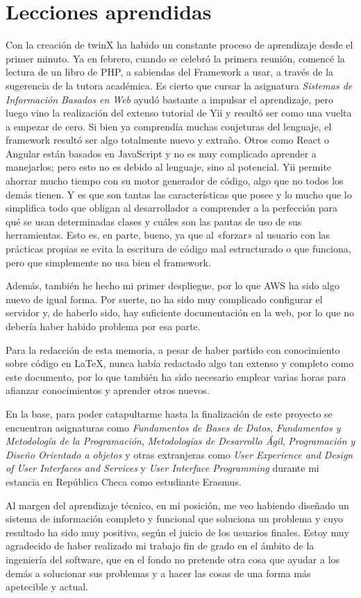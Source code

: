 \section{Lecciones aprendidas}

Con la creación de twinX ha habido un constante proceso de aprendizaje desde el primer minuto. Ya en febrero, cuando se celebró la primera reunión, comencé la lectura de un libro de PHP, a sabiendas del Framework a usar, a través de la sugerencia de la tutora académica. Es cierto que cursar la asignatura \textit{Sistemas de Información Basados en Web} ayudó bastante a impulsar el aprendizaje, pero luego vino la realización del extenso tutorial de Yii y resultó ser como una vuelta a empezar de cero. Si bien ya comprendía muchas conjeturas del lenguaje, el framework resultó ser algo totalmente nuevo y extraño. Otros como React o Angular están basados en JavaScript y no es muy complicado aprender a manejarlos; pero esto no es debido al lenguaje, sino al potencial. Yii permite ahorrar mucho tiempo con su motor generador de código, algo que no todos los demás tienen. Y es que son tantas las características que posee y lo mucho que lo simplifica todo que obligan al desarrollador a comprender a la perfección para qué se usan determinadas clases y cuáles son las pautas de uso de sus herramientas. Esto es, en parte, bueno, ya que al «forzar» al usuario con las prácticas propias se evita la escritura de código mal estructurado o que funciona, pero que simplemente no usa bien el framework.

Además, también he hecho mi primer despliegue, por lo que AWS ha sido algo nuevo de igual forma. Por suerte, no ha sido muy complicado configurar el servidor y, de haberlo sido, hay suficiente documentación en la web, por lo que no debería haber habido problema por esa parte.

Para la redacción de esta memoria, a pesar de haber partido con conocimiento sobre código en \LaTeX, nunca había redactado algo tan extenso y completo como este documento, por lo que también ha sido necesario emplear varias horas para afianzar conocimientos y aprender otros nuevos.

En la base, para poder catapultarme hasta la finalización de este proyecto se encuentran asignaturas como \textit{Fundamentos de Bases de Datos}, \textit{Fundamentos y Metodología de la Programación}, \textit{Metodologías de Desarrollo Ágil}, \textit{Programación y Diseño Orientado a objetos} y otras extranjeras como \textit{User Experience and Design of User Interfaces and Services} y \textit{User Interface Programming} durante mi estancia en República Checa como estudiante Erasmus.

Al margen del aprendizaje técnico, en mi posición, me veo habiendo diseñado un sistema de información completo y funcional que soluciona un problema y cuyo resultado ha sido muy positivo, según el juicio de los usuarios finales. Estoy muy agradecido de haber realizado mi trabajo fin de grado en el ámbito de la ingeniería del software, que en el fondo no pretende otra cosa que ayudar a los demás a solucionar sus problemas y a hacer las cosas de una forma más apetecible y actual.